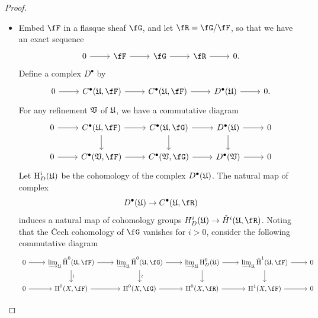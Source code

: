 \documentclass[a4paper]{article}
\begin{document}
\begin{enumerate} [label=\textbf{\arabic*.}, leftmargin=0em]
\begin{proof}
\begin{itemize} [leftmargin=0cm]
            \item[(c)] Embed $\fF$ in a flasque sheaf $\fG$, and let $\fR = \fG / \fF$, so that we have an exact sequence
                  \[ \begin{tikzcd}
                      0 \arrow[r] & \fF \arrow[r] & \fG \arrow[r] & \fR \arrow[r] & 0.
                    \end{tikzcd} \]
                  Define a complex $D^\bullet$ by
                  \[ \begin{tikzcd}
                      0 \arrow[r] & {C^\bullet (\goth{U}, \fF)} \arrow[r] & {C^\bullet (\goth{U}, \fF)} \arrow[r] & D^\bullet(\goth{U}) \arrow[r] & 0.
                    \end{tikzcd} \]
                  For any refinement $\mathfrak{V}$ of $\mathfrak{U}$, we have a commutative diagram
                  \[ \begin{tikzcd}
                      0 \arrow[r] & {C^\bullet(\goth{U}, \fF)} \arrow[d] \arrow[r] & {C^\bullet(\goth{U}, \fG)} \arrow[d] \arrow[r] & D^\bullet(\goth{U}) \arrow[d] \arrow[r] & 0 \\
                      0 \arrow[r] & {C^\bullet(\goth{V}, \fF)} \arrow[r]           & {C^\bullet(\goth{V}, \fG)} \arrow[r]           & D^\bullet(\goth{V}) \arrow[r]           & 0
                    \end{tikzcd} \]
                  Let $\operatorname{H}_D^i(\mathfrak{U})$ be the cohomology of the complex $D^\bullet(\mathfrak{U})$.
                  The natural map of complex
                  \begin{equation*}
                    D^\bullet(\goth{U}) \to C^\bullet(\goth{U}, \fR)
                  \end{equation*}
                  induces a natural map of cohomology groups $H_D^i(\goth{U}) \to \check{H}^i(\goth{U}, \fR)$.
                  Noting that the Čech cohomology of $\fG$ vanishes for $i > 0$, consider the following commutative diagram
                  \[ \begin{tikzcd}
                      0 \arrow[r] & {\varinjlim_\goth{U} \check{\cH}^0(\goth{U}, \fF)} \arrow[d, "\wr"] \arrow[r] & {\varinjlim_\goth{U} \check{\cH}^0(\goth{U}, \fG)} \arrow[r] \arrow[d, "\wr"] & \varinjlim_\goth{U} \cH_D^0(\goth{U}) \arrow[d] \arrow[r] & {\varinjlim_\goth{U} \check{\cH}^1(\goth{U}, \fF)} \arrow[d] \arrow[r] & 0 \\
                      0 \arrow[r] & {\cH^0(X, \fF)} \arrow[r]                                                     & {\cH^0(X, \fG)} \arrow[r]                                                     & {\cH^0(X, \fR)} \arrow[r]                                 & {\cH^1(X, \fF)} \arrow[r]                                              & 0

\end{tikzcd}\]
\end{itemize}
\end{proof}
\end{enumerate}
\end{document}
